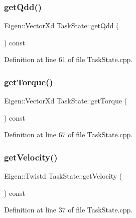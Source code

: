 \subsubsection{\texorpdfstring{get\+Qdd()}{getQdd()}}
{\footnotesize\ttfamily Eigen\+::\+Vector\+Xd Task\+State\+::get\+Qdd (\begin{DoxyParamCaption}{ }\end{DoxyParamCaption}) const}



Definition at line 61 of file Task\+State.\+cpp.

\hypertarget{classocra_1_1TaskState_a822fa2017408d2cd8ddbeb9ba2546e1e}{}\label{classocra_1_1TaskState_a822fa2017408d2cd8ddbeb9ba2546e1e} 
\subsubsection{\texorpdfstring{get\+Torque()}{getTorque()}}
{\footnotesize\ttfamily Eigen\+::\+Vector\+Xd Task\+State\+::get\+Torque (\begin{DoxyParamCaption}{ }\end{DoxyParamCaption}) const}



Definition at line 67 of file Task\+State.\+cpp.

\hypertarget{classocra_1_1TaskState_afe6820421d754df7b005e6ebc4e10919}{}\label{classocra_1_1TaskState_afe6820421d754df7b005e6ebc4e10919} 
\subsubsection{\texorpdfstring{get\+Velocity()}{getVelocity()}}
{\footnotesize\ttfamily Eigen\+::\+Twistd Task\+State\+::get\+Velocity (\begin{DoxyParamCaption}{ }\end{DoxyParamCaption}) const}



Definition at line 37 of file Task\+State.\+cpp.

\hypertarget{classocra_1_1TaskState_a4c825e39ca7b75dc4fcaf8015783983d}{}\label{classocra_1_1TaskState_a4c825e39ca7b75dc4fcaf8015783983d} 
